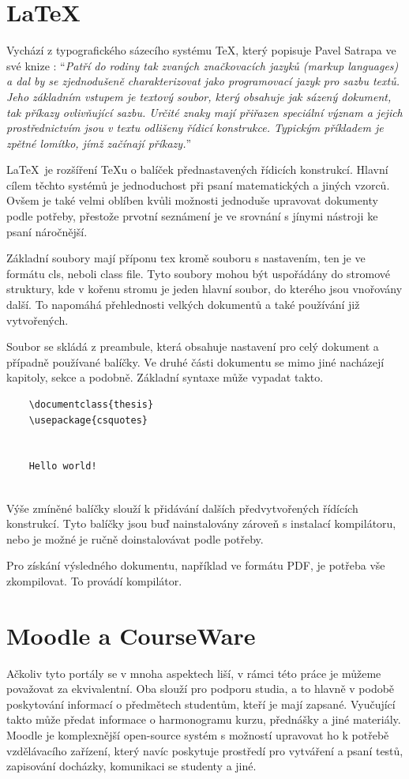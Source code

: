  \section{LaTeX} 
	Vychází z typografického sázecího systému \TeX, který popisuje Pavel Satrapa ve své knize \cite{latex}: \enquote{\textit{Patří do rodiny tak zvaných značkovacích jazyků (markup languages) a dal by se zjednodušeně charakterizovat jako programovací jazyk pro sazbu textů. Jeho základním vstupem je textový soubor, který obsahuje jak sázený dokument, tak příkazy ovlivňující sazbu. Určité znaky mají přiřazen speciální význam a jejich prostřednictvím jsou v textu odlišeny řídicí konstrukce. Typickým příkladem je zpětné lomítko, jímž začínají příkazy.}}
	
	\LaTeX\ je rozšíření \TeX u o balíček přednastavených řídicích konstrukcí. Hlavní cílem těchto systémů je jednoduchost při psaní matematických a jiných vzorců. Ovšem je také velmi oblíben kvůli možnosti jednoduše upravovat dokumenty podle potřeby, přestože prvotní seznámení je ve srovnání s jínymi nástroji ke psaní náročnější.
	
	Základní soubory mají příponu tex kromě souboru s nastavením, ten je ve formátu cls, neboli class file. Tyto soubory mohou být uspořádány do stromové struktury, kde v kořenu stromu je jeden hlavní soubor, do kterého jsou vnořovány další. To napomáhá přehlednosti velkých dokumentů a také používání již vytvořených. 
	
	Soubor se skládá z preambule, která obsahuje nastavení pro celý dokument a případně používané balíčky. Ve druhé části dokumentu se mimo jiné nacházejí kapitoly, sekce a podobně. Základní syntaxe může vypadat takto.
	\newpage
	\begin{verbatim}
	\documentclass{thesis}
	\usepackage{csquotes}
	
	
	Hello world!
	
	\end{verbatim}
	
	Výše zmíněné balíčky slouží k přidávání dalších předvytvořených řídících konstrukcí. Tyto balíčky jsou buď nainstalovány zároveň s instalací kompilátoru, nebo je možné je ručně doinstalovávat podle potřeby. 
	
	Pro získání výsledného dokumentu, například ve formátu PDF, je potřeba vše zkompilovat. To provádí kompilátor.  

\section{Moodle a CourseWare}
	Ačkoliv tyto portály se v mnoha aspektech liší, v rámci této práce je můžeme považovat za ekvivalentní. Oba slouží pro podporu studia, a to hlavně v podobě poskytování informací o předmětech studentům, kteří je mají zapsané. Vyučující takto může předat informace o harmonogramu kurzu, přednášky a jiné materiály. Moodle je komplexnější open-source systém s možností upravovat ho k potřebě vzdělávacího zařízení, který navíc poskytuje prostředí pro vytváření a psaní testů, zapisování docházky, komunikaci se studenty a jiné.

